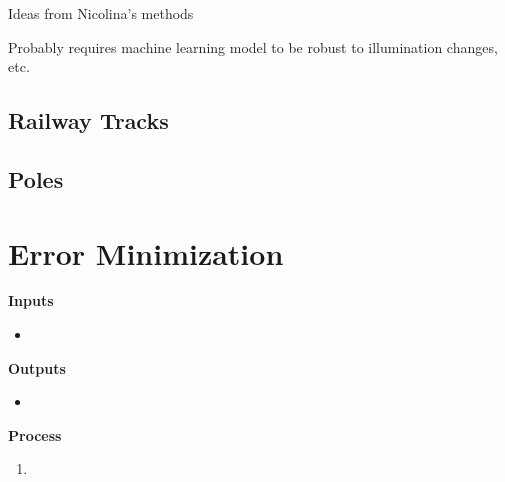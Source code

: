 Ideas from Nicolina's methods

Probably requires machine learning model to be robust to illumination changes, etc.

\subsection{Railway Tracks}


\subsection{Poles}



\section{Error Minimization}
\label{sec:error_minimization}

\begin{multicols}{2}
    \textbf{Inputs}
    \begin{itemize}
        \item 
    \end{itemize}
    
    \textbf{Outputs}
    \begin{itemize}
      \item 
    \end{itemize}

    \vfill\null
    \columnbreak

    \textbf{Process}
    \begin{enumerate}
        \item 
    \end{enumerate}
\end{multicols}